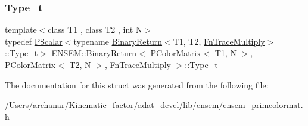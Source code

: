 \subsubsection{\texorpdfstring{Type\_t}{Type\_t}\hspace{0.1cm}{\footnotesize\ttfamily [2/2]}}
{\footnotesize\ttfamily template$<$class T1 , class T2 , int N$>$ \\
typedef \mbox{\hyperlink{classENSEM_1_1PScalar}{P\+Scalar}}$<$typename \mbox{\hyperlink{structENSEM_1_1BinaryReturn}{Binary\+Return}}$<$T1, T2, \mbox{\hyperlink{structENSEM_1_1FnTraceMultiply}{Fn\+Trace\+Multiply}}$>$\+::\mbox{\hyperlink{structENSEM_1_1BinaryReturn_3_01PColorMatrix_3_01T1_00_01N_01_4_00_01PColorMatrix_3_01T2_00_01N_01_4_00_01FnTraceMultiply_01_4_af772cf98211eae0f62f1d9a9f5475c9e}{Type\+\_\+t}}$>$ \mbox{\hyperlink{structENSEM_1_1BinaryReturn}{E\+N\+S\+E\+M\+::\+Binary\+Return}}$<$ \mbox{\hyperlink{classENSEM_1_1PColorMatrix}{P\+Color\+Matrix}}$<$ T1, \mbox{\hyperlink{operator__name__util_8cc_a7722c8ecbb62d99aee7ce68b1752f337}{N}} $>$, \mbox{\hyperlink{classENSEM_1_1PColorMatrix}{P\+Color\+Matrix}}$<$ T2, \mbox{\hyperlink{operator__name__util_8cc_a7722c8ecbb62d99aee7ce68b1752f337}{N}} $>$, \mbox{\hyperlink{structENSEM_1_1FnTraceMultiply}{Fn\+Trace\+Multiply}} $>$\+::\mbox{\hyperlink{structENSEM_1_1BinaryReturn_3_01PColorMatrix_3_01T1_00_01N_01_4_00_01PColorMatrix_3_01T2_00_01N_01_4_00_01FnTraceMultiply_01_4_af772cf98211eae0f62f1d9a9f5475c9e}{Type\+\_\+t}}}



The documentation for this struct was generated from the following file\+:\begin{DoxyCompactItemize}
\item 
/\+Users/archanar/\+Kinematic\+\_\+factor/adat\+\_\+devel/lib/ensem/\mbox{\hyperlink{lib_2ensem_2ensem__primcolormat_8h}{ensem\+\_\+primcolormat.\+h}}\end{DoxyCompactItemize}
